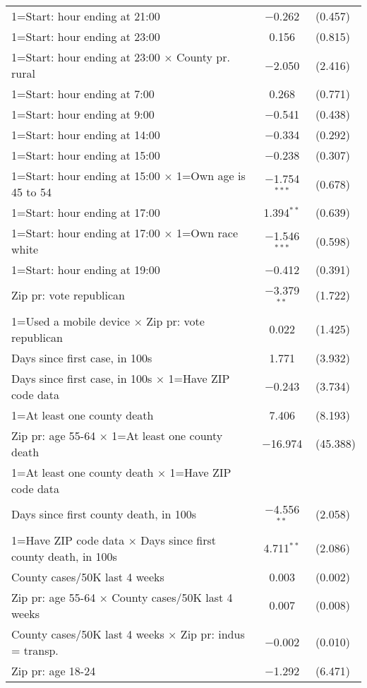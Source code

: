 \begin{table}[!htbp]
\begin{tabular}{@{\extracolsep{5pt}}lc}
  1=Start: hour ending at 21:00 & $-$0.262 & (0.457) \\ 
  1=Start: hour ending at 23:00 & 0.156 & (0.815) \\ 
  1=Start: hour ending at 23:00 $\times$ County pr. rural & $-$2.050 & (2.416) \\ 
  1=Start: hour ending at 7:00 & 0.268 & (0.771) \\ 
  1=Start: hour ending at 9:00 & $-$0.541 & (0.438) \\ 
  1=Start: hour ending at 14:00 & $-$0.334 & (0.292) \\ 
  1=Start: hour ending at 15:00 & $-$0.238 & (0.307) \\ 
  1=Start: hour ending at 15:00 $\times$ 1=Own age is 45 to 54 & $-$1.754$^{***}$ & (0.678) \\ 
  1=Start: hour ending at 17:00 & 1.394$^{**}$ & (0.639) \\ 
  1=Start: hour ending at 17:00 $\times$ 1=Own race white & $-$1.546$^{***}$ & (0.598) \\ 
  1=Start: hour ending at 19:00 & $-$0.412 & (0.391) \\ 
  Zip pr: vote republican & $-$3.379$^{**}$ & (1.722) \\ 
  1=Used a mobile device $\times$ Zip pr: vote republican & 0.022 & (1.425) \\ 
  Days since first case, in 100s & 1.771 & (3.932) \\ 
  Days since first case, in 100s $\times$ 1=Have ZIP code data & $-$0.243 & (3.734) \\ 
  1=At least one county death & 7.406 & (8.193) \\ 
  Zip pr: age 55-64 $\times$ 1=At least one county death & $-$16.974 & (45.388) \\ 
  1=At least one county death $\times$ 1=Have ZIP code data &  \\ 
  Days since first county death, in 100s & $-$4.556$^{**}$ & (2.058) \\ 
  1=Have ZIP code data $\times$ Days since first county death, in 100s & 4.711$^{**}$ & (2.086) \\ 
  County cases/50K last 4 weeks & 0.003 & (0.002) \\ 
  Zip pr: age 55-64 $\times$ County cases/50K last 4 weeks & 0.007 & (0.008) \\ 
  County cases/50K last 4 weeks $\times$ Zip pr: indus = transp. & $-$0.002 & (0.010) \\ 
  Zip pr: age 18-24 & $-$1.292 & (6.471) \\ 

\end{tabular}
\end{table}
